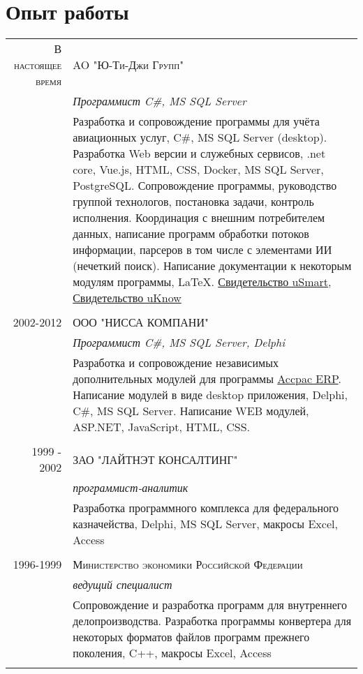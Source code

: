 \documentclass[a4paper,10pt]{article}
\begin{document}
\section{Опыт работы}
\begin{tabular}{r|p{11cm}}


\textsc{В настоящее время}& \textsc{AO "Ю-Ти-Джи Групп" } \\\textsc{}&\emph{Программист C\#, MS SQL Server}\\&
\footnotesize{
Разработка и сопровождение программы для учёта авиационных услуг, C\#, MS SQL Server (desktop). 
Разработка Web версии и служебных сервисов, .net core, Vue.js, HTML, CSS, Docker, MS SQL Server, PostgreSQL.
Сопровождение программы, руководство группой технологов, постановка задачи, контроль исполнения.
Координация с внешним потребителем данных, написание программ обработки потоков информации, 
парсеров в том числе с элементами ИИ (нечеткий поиск). Написание документации к некоторым модулям программы, LaTeX.
\href{https://flightphone.github.io/uSmart.pdf}{Свидетельство uSmart}, \href{https://flightphone.github.io/uKnow.pdf}{Свидетельство uKnow}
}\\\multicolumn{2}{c}{}\\

\textsc{2002-2012}& \textsc{ООО "НИССА КОМПАНИ" } \\\textsc{}&\emph{Программист C\#, MS SQL Server, Delphi}\\&
\footnotesize{Разработка и сопровождение независимых дополнительных модулей для программы \href{https://www.accpacnet.com/}{Accpac ERP}. 
Написание модулей в виде desktop приложения, Delphi, C\#, MS SQL Server. 
Написание WEB модулей, ASP.NET, JavaScript, HTML, CSS. 
 
}\\\multicolumn{2}{c}{}\\

\textsc{1999 - 2002}& \textsc{ЗАО "ЛАЙТНЭТ КОНСАЛТИНГ"} \\\textsc{}&\emph{программист-аналитик}\\&
\footnotesize{Разработка программного комплекса для федерального казначейства, 
Delphi, MS SQL Server, макросы Excel, Access

}\\\multicolumn{2}{c}{}\\

\textsc{1996-1999}& \textsc{Министерство экономики Российской Федерации}  \\\textsc{}&\emph{ведущий специалист}\\&
\footnotesize{Сопровождение и разработка программ для внутреннего делопроизводства. 
Разработка программы конвертера для некоторых форматов файлов программ прежнего поколения, C++, макросы Excel, Access
}\\\multicolumn{2}{c}{} \\
 

\end{tabular}
\end{document}

